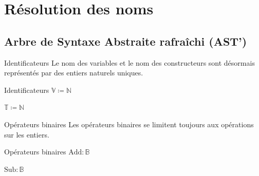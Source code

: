 \documentclass{beamer}
\begin{document}
\section{Résolution des noms}

\subsection{Arbre de Syntaxe Abstraite rafraîchi (AST')}

\begin{frame}{Identificateurs}
    Le nom des variables et le nom des constructeurs sont désormais représentés par des entiers naturels uniques.

    \begin{block}{Identificateurs}
        $\mathbb{V} \coloneqq \mathbb{N}$%

        $\mathbb{T} \coloneqq \mathbb{N}$%
    \end{block}
\end{frame}

\begin{frame}{Opérateurs binaires}
    Les opérateurs binaires se limitent toujours aux opérations sur les entiers.

    \begin{block}{Opérateurs binaires}
        $\text{Add} : \mathbb{B}$%

        $\text{Sub} : \mathbb{B}$%
    \end{block}
\end{frame}
\end{document}
